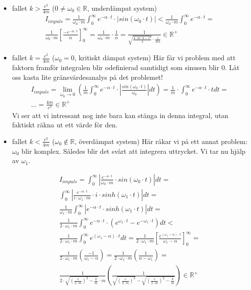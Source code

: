 \documentclass[10pt,a4paper]{article}
\begin{document}
\begin{itemize}
\item fallet $k>\frac{c^2}{4m}$ ($0\neq\omega_0 \in \mathbb{R}$, underdämpat system)
\begin{multline}
I_{impuls}=\frac{1}{\omega_0 \cdot m}\int_{0}^{\infty}e^{-\alpha\cdot t}\cdot | sin(\omega_0\cdot t)|<\frac{1}{\omega_0 \cdot m}\int_{0}^{\infty}e^{-\alpha\cdot t}=\\\frac{1}{\omega_0 \cdot m} \left[\frac{-e^{-\alpha\cdot t}}{\alpha}\right]_0^\infty=\frac{1}{\omega_0 \cdot m}\cdot \frac{1}{\alpha}=\frac{1}{\sqrt{\frac{4\cdot m\cdot k- c^2}{4}}\cdot\frac{c}{2m}}\in \mathbb{R}^+
\end{multline}
\item fallet $k=\frac{c^2}{4m}$ ($\omega_0=0$, kritiskt dämpat system)
\newline Här får vi problem med att faktorn framför integralen blir odefinierad samtidigt som sinusen blir 0. Låt oss kasta lite gränsvärdesanalys på det problemet!
\begin{multline}
I_{impuls}=\lim_{\omega_0\to0}\left(\frac{1}{m}\int_{0}^{\infty}e^{-\alpha\cdot t}\cdot |\frac{sin(\omega_0\cdot t)}{\omega_0}|dt\right)=\frac{1}{m}\cdot\int_{0}^{\infty}e^{-\alpha\cdot t}\cdot t  dt=\\...=\frac{4m}{c^2}\in \mathbb{R}^+
\end{multline}
Vi ser att vi intressant nog inte bara kan stänga in denna integral, utan faktiskt räkna ut ett värde för den.
\item fallet $k<\frac{c^2}{4m}$ ($\omega_0 \notin \mathbb{R}$, överdämpat system)
\newline Här råkar vi på ett annat problem: $\omega_0$ blir komplex. Således blir det svårt att integrera uttrycket. Vi tar nu hjälp av $\omega_1$.

\begin{multline}
I_{impuls}=\int_{0}^{\infty}\left|\frac{e^{-\alpha\cdot t}}{\omega_0 \cdot m}\cdot sin(\omega_0\cdot t)\right|dt=\\ \int_{0}^{\infty}\left|\frac{e^{-\alpha\cdot t}}{i\cdot\omega_1 \cdot m}\cdot i\cdot sinh(\omega_1\cdot t)\right|dt=\\ \frac{1}{\omega_1 \cdot m}\int_{0}^{\infty}\left|e^{-\alpha\cdot t}\cdot sinh(\omega_1\cdot t)\right|dt=\\ \frac{1}{2 \cdot\omega_1 \cdot m}\int_{0}^{\infty}e^{-\alpha\cdot t}\cdot \left( e^{\omega_1\cdot t}-e^{-\omega_1\cdot t} \right) dt< \\ \frac{1}{2\cdot\omega_1 \cdot m}\int_{0}^{\infty}e^{(\omega_1-\alpha)\cdot t} dt=\frac{1}{2\cdot\omega_1 \cdot m}\left[\frac{e^{(\omega_1-\alpha)\cdot t}}{\omega_1-\alpha} \right]_{0}^{\infty}=\\ \frac{1}{2\cdot\omega_1 \cdot m}\left(\frac{-1}{\omega_1-\alpha} \right)=\frac{1}{2\cdot\omega_1 \cdot m}\left(\frac{1}{\alpha-\omega_1} \right)=\\ \frac{1}{2\cdot   \sqrt{\left(\frac{c}{2\cdot m}\right)^2-\frac{k}{m}}   \cdot m}\left(\frac{1}{\sqrt{\left(\frac{c}{2\cdot m}\right)^2}-\sqrt{\left(\frac{c}{2\cdot m}\right)^2-\frac{k}{m}}} \right)\in \mathbb{R}^+
\end{multline}
\end{itemize}
\end{document}
